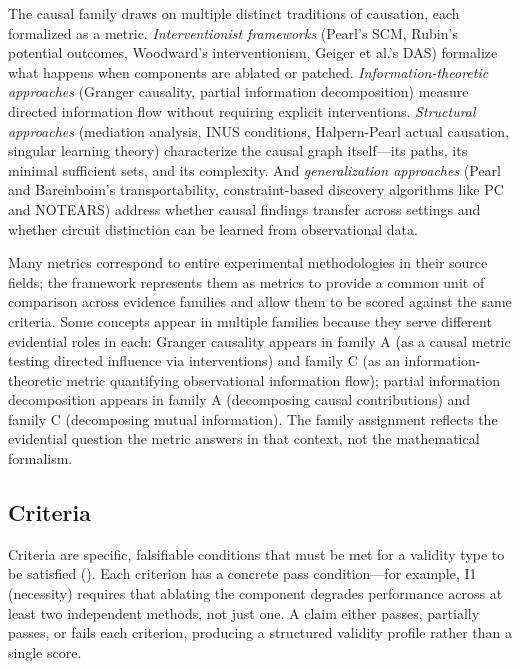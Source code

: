 \documentclass[10pt]{article}
\begin{document}
The causal family draws on multiple distinct traditions of causation, each formalized as a metric. \emph{Interventionist frameworks} (Pearl's SCM, Rubin's potential outcomes, Woodward's interventionism, Geiger et al.'s DAS) formalize what happens when components are ablated or patched. \emph{Information-theoretic approaches} (Granger causality, partial information decomposition) measure directed information flow without requiring explicit interventions. \emph{Structural approaches} (mediation analysis, INUS conditions, Halpern-Pearl actual causation, singular learning theory) characterize the causal graph itself---its paths, its minimal sufficient sets, and its complexity. And \emph{generalization approaches} (Pearl and Bareinboim's transportability, constraint-based discovery algorithms like PC and NOTEARS) address whether causal findings transfer across settings and whether circuit distinction can be learned from observational data.


Many metrics correspond to entire experimental methodologies in their source fields; the framework represents them as metrics to provide a common unit of comparison across evidence families and allow them to be scored against the same criteria. Some concepts appear in multiple families because they serve different evidential roles in each: Granger causality appears in family A (as a causal metric testing directed influence via interventions) and family C (as an information-theoretic metric quantifying observational information flow); partial information decomposition appears in family A (decomposing causal contributions) and family C (decomposing mutual information). The family assignment reflects the evidential question the metric answers in that context, not the mathematical formalism.

\subsection{Criteria}
\label{sec:criteria}

Criteria are specific, falsifiable conditions that must be met for a validity type to be satisfied (). Each criterion has a concrete pass condition---for example, I1 (necessity) requires that ablating the component degrades performance across at least two independent methods, not just one. A claim either passes, partially passes, or fails each criterion, producing a structured validity profile rather than a single score.
\end{document}
